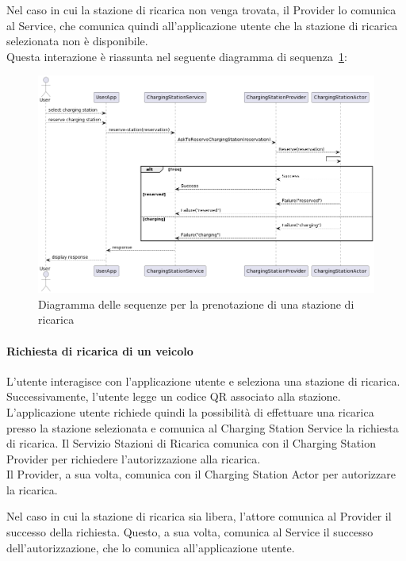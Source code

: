 Nel caso in cui la stazione di ricarica non venga trovata, il Provider lo comunica al Service,
che comunica quindi all'applicazione utente che la stazione di ricarica selezionata non è disponibile.\\

Questa interazione è riassunta nel seguente diagramma di sequenza \ref{fig:reserve-station}:

\begin{figure}[htbp]
    \centering
    \includegraphics[width=\textwidth]{images/reserve-station.png}
    \caption{Diagramma delle sequenze per la prenotazione di una stazione di ricarica}
    \label{fig:reserve-station}
\end{figure}

\paragraph{Richiesta di ricarica di un veicolo}
L'utente interagisce con l'applicazione utente  e seleziona una stazione di ricarica.
Successivamente, l'utente legge un codice QR associato alla stazione.\\

L'applicazione utente richiede quindi la possibilità di effettuare una ricarica presso
la stazione selezionata e comunica al Charging Station Service la richiesta di ricarica.
Il Servizio Stazioni di Ricarica comunica con il Charging Station Provider per richiedere
l'autorizzazione alla ricarica.\\

Il Provider, a sua volta, comunica con il Charging Station Actor per autorizzare la ricarica.

Nel caso in cui la stazione di ricarica sia libera, l'attore comunica al Provider il successo
della richiesta. Questo, a sua volta, comunica al Service il successo dell'autorizzazione,
che lo comunica all'applicazione utente.\\

